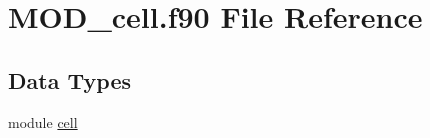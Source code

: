 \hypertarget{MOD__cell_8f90}{\section{M\-O\-D\-\_\-cell.\-f90 File Reference}
\label{MOD__cell_8f90}
}
\subsection*{Data Types}
\begin{DoxyCompactItemize}
\item 
module \hyperlink{classcell}{cell}
\end{DoxyCompactItemize}
